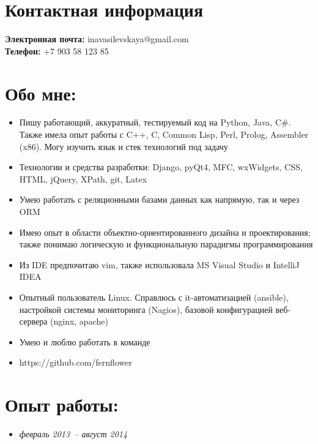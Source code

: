 \documentclass{res}
\begin{document}
    \begin{resume}
        \section{Контактная информация}
        {\bf Электронная почта:} inavasilevskaya@gmail.com \\
        {\bf Телефон:} +7 903 58 123 85\\
        \section{Обо мне:}
        \begin{itemize}
            \item Пишу работающий, аккуратный, тестируемый код на Python, Java, C\#.
              Также имела опыт работы с C++, C, Common Lisp, Perl, Prolog, Assembler (x86). 
              Могу изучить язык и стек технологий под задачу
              
            \item Технологии и средства разработки: Django, pyQt4, MFC, wxWidgets,
                CSS, HTML, jQuery, XPath, git, Latex 

            \item Умею работать с реляционными базами данных как напрямую, так и через ORM

            \item Имею опыт в области объектно-ориентированного дизайна и проектирования; 
                также понимаю логическую и функциональную парадигмы программирования

            \item Из IDE предпочитаю vim, также использовала MS Visual Studio и IntelliJ IDEA

            \item Опытный пользователь Linux. Справлюсь с it-автоматизацией (ansible), настройкой
                системы мониторинга (Nagios), базовой конфигурацией веб-сервера (nginx, apache)

            \item Умею и люблю работать в команде

            \item https://github.com/fernflower

        \end{itemize}

        \section{Опыт работы:}
        \begin{itemize}
            \item \textit{февраль 2013~-- август 2014}
                

\end{itemize}
\end{resume}
\end{document}
